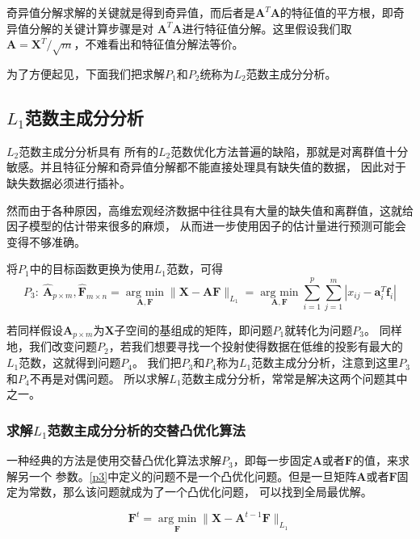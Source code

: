 奇异值分解求解的关键就是得到奇异值，而后者是$\bm{A}^T\bm{A}$的特征值的平方根，即奇异值分解的关键计算步骤是对
$\bm{A}^T\bm{A}$进行特征值分解。这里假设我们取$\bm{A} = {\bm{X}^T}/{\sqrt{m}}$，不难看出和特征值分解法等价。

为了方便起见，下面我们把求解$P_1$和$P_2$统称为$L_2$范数主成分分析。

\subsection{$L_1$范数主成分分析}

$L_2$范数主成分分析具有
所有的$L_2$范数优化方法普遍的缺陷，那就是对离群值十分敏感。并且特征分解和奇异值分解都不能直接处理具有缺失值的数据，
因此对于缺失数据必须进行插补。

然而由于各种原因，高维宏观经济数据中往往具有大量的缺失值和离群值，这就给因子模型的估计带来很多的麻烦，
从而进一步使用因子的估计量进行预测可能会变得不够准确。

将$P_1$中的目标函数更换为使用$L_1$范数，可得
\begin{equation}\label{p3}
    P_3: \ 
\hat{\bm{A}}_{p\times m}, \hat{\bm{F}}_{m\times n} = \underset{\bm{A},\bm{F}}{\operatorname{arg\ min} } \|\bm X - \bm{A}\bm{F}\|_{L_1}
= \underset{\bm{A}, \bm{F}}{\operatorname{arg\ min}} \sum_{i=1}^p \sum_{j=1}^m |x_{ij} - \bm a_i^T \bm f_i| 
\end{equation}

若同样假设$\bm{A}_{p\times m}$为$\bm{X}$子空间的基组成的矩阵，即问题$P_1$就转化为问题$P_3$。
同样地，我们改变问题$P_2$，若我们想要寻找一个投射使得数据在低维的投影有最大的$L_1$范数，这就得到问题$P_4$。
我们把$P_3$和$P_4$称为$L_1$范数主成分分析，注意到这里$P_3$和$P_4$不再是对偶问题。
所以求解$L_1$范数主成分分析，常常是解决这两个问题其中之一。

\subsubsection{求解$L_1$范数主成分分析的交替凸优化算法}

一种经典的方法是使用交替凸优化算法\cite{ke2005robust}求解$P_3$，即每一步固定$\bm{A}$或者$\bm{F}$的值，来求解另一个
参数。\eqref{p3}中定义的问题不是一个凸优化问题。但是一旦矩阵$\bm{A}$或者$\bm{F}$固定为常数，那么该问题就成为了一个凸优化问题，
可以找到全局最优解。

\begin{equation}\label{pro1}
\bm F^{t} = \underset{\bm F}{\operatorname{arg\ min}} \|\bm{X} - \bm{A}^{t-1}\bm{F} \|_{L_1} 
\end{equation}

